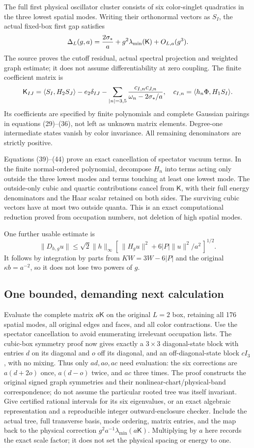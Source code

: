 \documentclass[
  11pt,
]{article}
\begin{document}
The full first physical oscillator cluster consists of six color-singlet
quadratics in the three lowest spatial modes. Writing their orthonormal
vectors as \(S_I\), the actual fixed-box first gap satisfies \[
 \Delta_L(g,a)={2\sigma_*\over a}
                 +g^2\lambda_{\min}(\mathsf K)+O_{L,a}(g^3).
\] The source proves the cutoff residual, actual spectral projection and
weighted graph estimate; it does not assume differentiability at zero
coupling. The finite coefficient matrix is \[
 \mathsf K_{IJ}
 =\langle S_I,H_2S_J\rangle-e_2\delta_{IJ}
 -\sum_{|n|=3,5}{c_{I,n}c_{J,n}\over\omega_n-2\sigma_*/a},
 \quad c_{I,n}=\langle h_n\Phi,H_1S_I\rangle .
\] Its coefficients are specified by finite polynomials and complete
Gaussian pairings in equations (29)--(36), not left as unknown matrix
elements. Degree-one intermediate states vanish by color invariance. All
remaining denominators are strictly positive.

Equations (39)--(44) prove an exact cancellation of spectator vacuum
terms. In the finite normal-ordered polynomial, decompose \(H_n\) into
terms acting only outside the three lowest modes and terms touching at
least one lowest mode. The outside-only cubic and quartic contributions
cancel from \(\mathsf K\), with their full energy denominators and the
Haar scalar retained on both sides. The surviving cubic vectors have at
most two outside quanta. This is an exact computational reduction proved
from occupation numbers, not deletion of high spatial modes.

One further usable estimate is \[
 \|D_{h,g}u\|\le\sqrt2\|h\|_\infty
 [\,\|H_gu\|^2+6|P|\|u\|^2/a^2\,]^{1/2}.
\] It follows by integration by parts from \(KW=3W-6|P|\) and the
original \(\kappa b=a^{-2}\), so it does not lose two powers of \(g\).

\subsection{One bounded, demanding next
calculation}\label{weak-coupling-part-17-one-bounded-demanding-next-calculation}

Evaluate the complete matrix \(a\mathsf K\) on the original \(L=2\) box,
retaining all 176 spatial modes, all original edges and faces, and all
color contractions. Use the spectator cancellation to avoid enumerating
irrelevant occupation lists. The cubic-box symmetry proof now gives
exactly a \(3\times3\) diagonal-state block with entries \(d\) on its
diagonal and \(o\) off its diagonal, and an off-diagonal-state block
\(cI_3\), with no mixing. Thus only \(ad,ao,ac\) need evaluation: the
six corrections are \(a(d+2o)\) once, \(a(d-o)\) twice, and \(ac\) three
times. The proof constructs the original signed graph symmetries and
their nonlinear-chart/physical-band correspondence; do not assume the
particular rooted tree was itself invariant. Give certified rational
intervals for its six eigenvalues, or an exact algebraic representation
and a reproducible integer outward-enclosure checker. Include the actual
tree, full transverse basis, mode ordering, matrix entries, and the map
back to the physical correction \(g^2a^{-1}\lambda_{\min}(a\mathsf K)\).
Multiplying by \(a\) here records the exact scale factor; it does not
set the physical spacing or energy to one.
\end{document}
